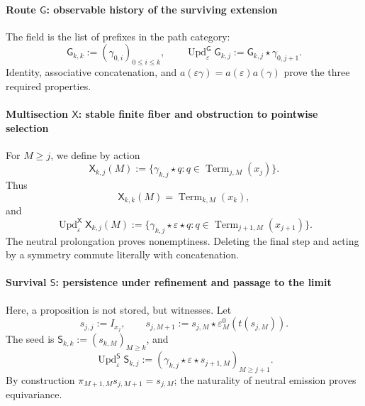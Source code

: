 \paragraph{Route \(\mathsf G\): observable history of the surviving extension}
The field is the list of prefixes in the path category:
\begin{equation}
\label{eq:pdfv2-terminal-update-g}
 \mathsf G_{k,k}:=(\gamma_{0,i})_{0\leq i\leq k},\qquad
 \operatorname{Upd}^{\mathsf G}_{\varepsilon}\mathsf G_{k,j}
 :=\mathsf G_{k,j}\star\gamma_{0,j+1}.
\end{equation}
Identity, associative concatenation, and
\(a(\varepsilon\gamma)=a(\varepsilon)a(\gamma)\) prove the three
required properties.

\paragraph{Multisection \(\mathsf X\): stable finite fiber and obstruction to pointwise selection}
For \(M\geq j\), we define by action
\begin{equation}
\label{eq:pdfv2-terminal-multiseccion-interna}
 \mathsf X_{k,j}(M):=
 \{\gamma_{k,j}\star q:
 q\in\operatorname{Term}_{j,M}(x_j)\}.
\end{equation}
Thus
\[
 \mathsf X_{k,k}(M)=\operatorname{Term}_{k,M}(x_k),
\]
and
\begin{equation}
\label{eq:pdfv2-terminal-update-x}
 \operatorname{Upd}^{\mathsf X}_{\varepsilon}\mathsf X_{k,j}(M)
 :=
 \{\gamma_{k,j}\star\varepsilon\star q:
 q\in\operatorname{Term}_{j+1,M}(x_{j+1})\}.
\end{equation}
The neutral prolongation proves nonemptiness. Deleting the final step and acting
by a symmetry commute literally with concatenation.

\paragraph{Survival \(\mathsf S\): persistence under refinement and passage to the limit}
Here, a proposition is not stored, but witnesses. Let
\begin{equation}
\label{eq:pdfv2-terminal-testigo-neutro}
 s_{j,j}:=I_{x_j},\qquad
 s_{j,M+1}:=s_{j,M}\star
 \varepsilon_M^0(t(s_{j,M})).
\end{equation}
The seed is
\(\mathsf S_{k,k}:=(s_{k,M})_{M\geq k}\), and
\begin{equation}
\label{eq:pdfv2-terminal-update-s}
 \operatorname{Upd}^{\mathsf S}_{\varepsilon}\mathsf S_{k,j}
 :=(\gamma_{k,j}\star\varepsilon\star s_{j+1,M})_{M\geq j+1}.
\end{equation}
By construction
\(\pi_{M+1,M}s_{j,M+1}=s_{j,M}\); the naturality of neutral emission
proves equivariance.

